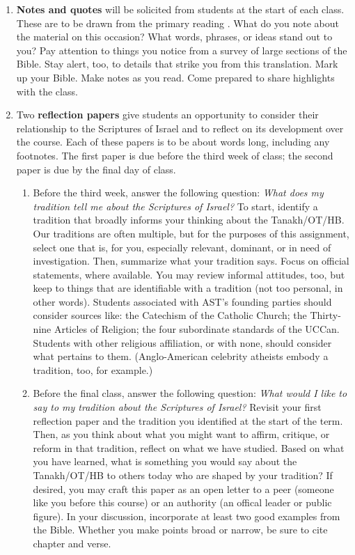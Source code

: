 \documentclass[titlepage]{article}
\begin{document}
\begin{enumerate}

	\item \textbf{Notes and quotes} will be solicited from students at
	the start of each class. These are to be drawn from the primary
	reading \cite{njps}. What do you note about the material on this
	occasion? What words, phrases, or ideas stand out to you? Pay
	attention to things you notice from a survey of large sections of
	the Bible. Stay alert, too, to details that strike you from this
	translation. Mark up your Bible. Make notes as you read. Come
	prepared to share highlights with the class.

	\item Two \textbf{reflection papers} give students an opportunity to
	consider their relationship to the Scriptures of Israel and to
	reflect on its development over the course. Each of these papers is
	to be about  words long, including any footnotes.
	The first paper is due before the third week of class; the second
	paper is due by the final day of class.

	\begin{enumerate}

		\item Before the third week, answer the following question:
		\emph{What does my tradition tell me about the Scriptures of
		Israel?} To start, identify a tradition that broadly informs
		your thinking about the Tanakh/OT/HB. Our traditions are often
		multiple, but for the purposes of this assignment, select one
		that is, for you, especially relevant, dominant, or in need of
		investigation. Then, summarize what your tradition says. Focus
		on official statements, where available. You may review informal
		attitudes, too, but keep to things that are identifiable with a
		tradition (not too personal, in other words). Students
		associated with AST's founding parties should consider sources
		like: the Catechism of the Catholic Church; the Thirty-nine
		Articles of Religion; the four subordinate standards of the
		UCCan. Students with other religious affiliation, or with none,
		should consider what pertains to them. (Anglo-American celebrity
		atheists embody a tradition, too, for example.)

		\item Before the final class, answer the following question:
		\emph{What would I like to say to my tradition about the
		Scriptures of Israel?} Revisit your first reflection paper and
		the tradition you identified at the start of the term. Then, as
		you think about what you might want to affirm, critique, or
		reform in that tradition, reflect on what we have studied. Based
		on what you have learned, what is something you would say about
		the Tanakh/OT/HB to others today who are shaped by your
		tradition? If desired, you may craft this paper as an open
		letter to a peer (someone like you before this course) or an
		authority (an offical leader or public figure). In your
		discussion, incorporate at least two good examples from the
		Bible. Whether you make points broad or narrow, be sure to cite
		chapter and verse.


\end{enumerate}
\end{enumerate}
\end{document}
